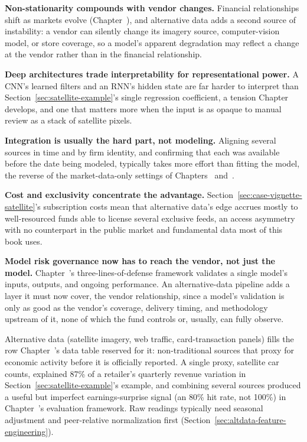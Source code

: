 \documentclass[../ai_in_finance]{subfiles}
\begin{document}
\textbf{Non-stationarity compounds with vendor changes.} Financial relationships shift as markets evolve (Chapter~), and alternative data adds a second source of instability: a vendor can silently change its imagery source, computer-vision model, or store coverage, so a model's apparent degradation may reflect a change at the vendor rather than in the financial relationship.

\textbf{Deep architectures trade interpretability for representational power.} A CNN's learned filters and an RNN's hidden state are far harder to interpret than Section~\ref{sec:satellite-example}'s single regression coefficient, a tension Chapter~ develops, and one that matters more when the input is as opaque to manual review as a stack of satellite pixels.

\textbf{Integration is usually the hard part, not modeling.} Aligning several sources in time and by firm identity, and confirming that each was available before the date being modeled, typically takes more effort than fitting the model, the reverse of the market-data-only settings of Chapters~ and~.

\textbf{Cost and exclusivity concentrate the advantage.} Section~\ref{sec:case-vignette-satellite}'s subscription costs mean that alternative data's edge accrues mostly to well-resourced funds able to license several exclusive feeds, an access asymmetry with no counterpart in the public market and fundamental data most of this book uses.

\textbf{Model risk governance now has to reach the vendor, not just the model.} Chapter~'s three-lines-of-defense framework validates a single model's inputs, outputs, and ongoing performance. An alternative-data pipeline adds a layer it must now cover, the vendor relationship, since a model's validation is only as good as the vendor's coverage, delivery timing, and methodology upstream of it, none of which the fund controls or, usually, can fully observe.


Alternative data (satellite imagery, web traffic, card-transaction panels) fills the row Chapter~'s data table reserved for it: non-traditional sources that proxy for economic activity before it is officially reported. A single proxy, satellite car counts, explained 87\% of a retailer's quarterly revenue variation in Section~\ref{sec:satellite-example}'s example, and combining several sources produced a useful but imperfect earnings-surprise signal (an 80\% hit rate, not 100\%) in Chapter~'s evaluation framework. Raw readings typically need seasonal adjustment and peer-relative normalization first (Section~\ref{sec:altdata-feature-engineering}).
\end{document}

